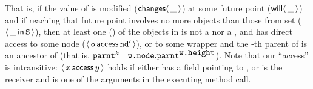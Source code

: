 \noindent
That is, if  the value of  is modified (${\mathsf{changes}}\langle\,\_\,\rangle$) at some future point (${\mathsf{will}}\langle \,\_\,\rangle$) 
and if reaching that future point involves no more objects than those from
set  (\ie ${\langle\, \_\, \mathsf{in}\, {\mbox{\tt{S}}}\, \rangle}$), then at least one () of the objects in  is not a  nor a , and  has direct access to some  node ($\langle\, {\mbox{\tt{o}}}\, \mathsf{access}\, {\mbox{\tt{nd}}}'\, \rangle$), or  to some wrapper  and the -th parent of  is an ancestor of  (that is, ${\mbox{\tt{parnt}}}^k\!=\!{\mbox{\tt{w.node}}}.{\mbox{\tt{parnt}}}^{{\mbox{\tt{w.height}}}}$).
 Note that our ``access'' is intransitive: $\langle\, x\, \mathsf{access}\, y\, \rangle$ holds if  either  has a field  pointing to , or    is the receiver and  is one of the arguments  in the executing method call.
 
 
